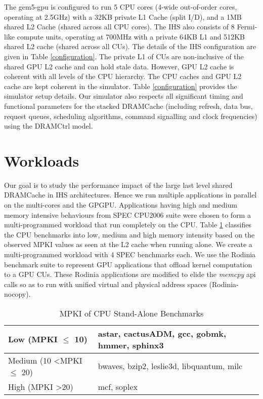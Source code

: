 The gem5-gpu is configured to run 5 CPU cores (4-wide out-of-order cores, operating at 2.5GHz) with a 32KB private L1 Cache (split I/D), and a 1MB shared L2 Cache (shared across all CPU cores). The IHS also consists of 8 Fermi-like compute units, operating at 700MHz with a private 64KB L1 and 512KB shared L2 cache (shared across all CUs). The details of the IHS configuration are given in Table \ref{configuration}. The private L1 of CUs are non-inclusive of the shared GPU L2 cache and can hold stale data. However, GPU L2 cache is coherent with all levels of the CPU hierarchy. The CPU caches and GPU L2 cache are kept coherent in the simulator. Table \ref{configuration} provides the simulator setup details. 
Our simulator also respects all significant timing and functional parameters for the stacked DRAMCache (including refresh, data bus, request queues, scheduling algorithms, command signalling and clock frequencies) using the DRAMCtrl \cite{dramctrl} model.

\section{Workloads} 
Our goal is to study the performance impact of the large last level shared DRAMCache in IHS architectures. Hence we run multiple applications in parallel on the multi-cores and the GPGPU. Applications having high and medium memory intensive behaviours from SPEC CPU2006 suite \cite{spec2006} were chosen to form a multi-programmed workload that run completely on the CPU. Table \ref{single-cpu-mpki} classifies the CPU benchmarks into low, medium and high memory intensity based on the observed MPKI values as seen at the L2 cache when running alone. We create a multi-programmed workload with 4 SPEC benchmarks each. We use the Rodinia benchmark suite \cite{rodinia} to represent GPU applications that offload kernel computation to a GPU CUs. These Rodinia applications are modified to elide the \textit{memcpy} api calls so as to run with unified virtual and physical address spaces (Rodinia-nocopy). 

\begin{table}[htb]
	\centering
	\begin{tabular}{|l|l|}
		\hline
		Low (MPKI $\leq$ 10)          \hspace{5em}      & astar, cactusADM, gcc, gobmk, hmmer, sphinx3    \\ \hline
		Medium (10 \textless MPKI $\leq$ 20) & bwaves, bzip2, leslie3d, libquantum, milc \\ \hline
		High (MPKI \textgreater 20)            & mcf, soplex       \\ \hline
	\end{tabular}
	\caption{MPKI of CPU Stand-Alone Benchmarks}
	\label{single-cpu-mpki}
\end{table}

